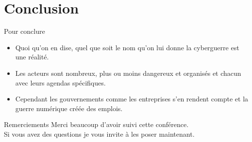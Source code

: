 \documentclass{beamer}
\begin{document}
\section{Conclusion}

\begin{frame}{Pour conclure}
  
  \begin{itemize}
  \pause \item Quoi qu'on en dise, quel que soit le nom qu'on lui donne \alert{la cyberguerre est une réalité}.
  \pause \item Les acteurs sont \alert{nombreux, plus ou moins dangereux et organisés} et chacun avec leurs agendas spécifiques.
  \pause \item Cependant les gouvernements comme les entreprises s'en rendent compte et \alert{la guerre numérique créée des emplois}.
  \end{itemize}

\end{frame}

\begin{frame}{Remerciements}
    Merci beaucoup d'avoir suivi cette conférence.\\
    Si vous avez des questions je vous invite à les poser maintenant.\\
    
    
\end{frame}
\end{document}
